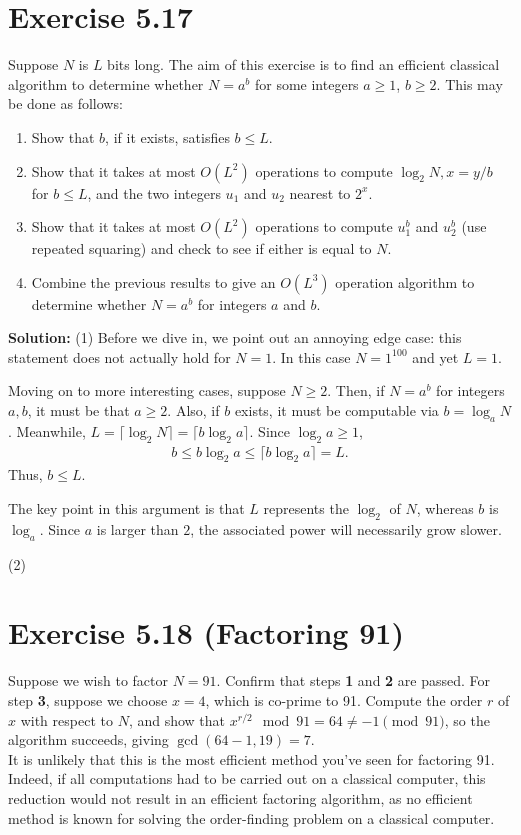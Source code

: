 \documentclass{book}
\begin{document}
\section*{Exercise 5.17}
    Suppose $N$ is $L$ bits long. The aim of this exercise is to find an efficient classical algorithm to determine whether $N=a^b$ for some integers $a\geq 1$, $b \geq 2$. This may be done as follows:
    \begin{enumerate}
        \item Show that $b$, if it exists, satisfies $b\leq L$.
        \item Show that it takes at most $O(L^2)$ operations to compute $\log_2 N, x = y/b$ for $b \leq L$, and the two integers $u_1$ and $u_2$ nearest to $2^x$.
        \item Show that it takes at most $O(L^2)$ operations to compute $u_1^b$ and $u_2^b$ (use repeated squaring) and check to see if either is equal to $N$.
        \item Combine the previous results to give an $O(L^3)$ operation algorithm to determine whether $N = a^b$ for integers $a$ and $b$.
    \end{enumerate}

    \textbf{Solution:}
    (1) Before we dive in, we point out an annoying edge case: this statement does not actually hold for $N =1$. In this case $N = 1^{100}$ and yet $L = 1$. 
    
    Moving on to more interesting cases, suppose $N \geq 2$. Then, if $N = a^b$ for integers $a, b$, it must be that $a \geq 2$. Also, if $b$ exists, it must be computable via $b = \log_a N$. Meanwhile,  $L = \lceil\log_2 N\rceil = \lceil b \log_2 a \rceil$. Since $\log_2 a \geq 1$,
    \begin{align}
        b \leq b \log_2 a \leq \lceil b \log_2 a \rceil = L.
    \end{align}
    Thus, $b \leq L$. 
    
    The key point in this argument is that $L$ represents the $\log_2$ of $N$, whereas $b$ is $\log_a$. Since $a$ is larger than $2$, the associated power will necessarily grow slower. 
    
    (2)
    
\section*{Exercise 5.18 (Factoring 91)}
    Suppose we wish to factor $N = 91$. Confirm that steps \textbf{1} and \textbf{2} are passed. For step \textbf{3}, suppose we choose $x = 4$, which is co-prime to 91. Compute the order $r$ of $x$ with respect to $N$, and show that $x^{r/2} \mod 91 = 64 \neq -1\pmod{91}$, so the algorithm succeeds, giving $\gcd(64-1,19)=7$.\\
    It is unlikely that this is the most efficient method you’ve seen for factoring 91. Indeed, if all computations had to be carried out on a classical computer, this reduction would not result in an efficient factoring algorithm, as no efficient method is known for solving the order-finding problem on a classical computer.
    
\end{document}
